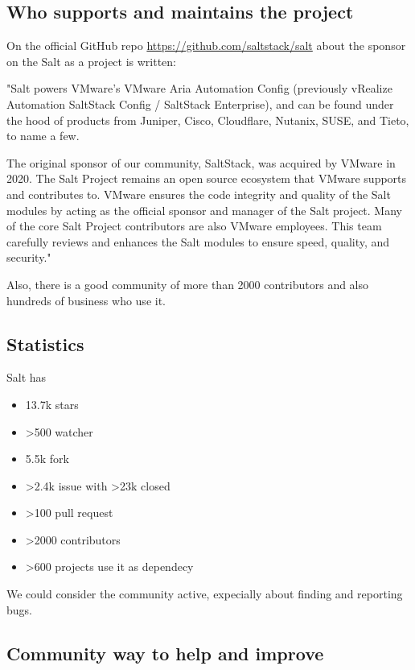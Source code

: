\documentclass[12pt,a4paper,openright,twoside]{book}
\begin{document}
\subsection{Who supports and maintains the project}
On the official GitHub repo \url{https://github.com/saltstack/salt} about the sponsor on the Salt as a project is written:


"Salt powers VMware's VMware Aria Automation Config (previously vRealize Automation SaltStack Config / SaltStack Enterprise), and can be found under the hood of products from Juniper, Cisco, Cloudflare, Nutanix, SUSE, and Tieto, to name a few.


The original sponsor of our community, SaltStack, was acquired by VMware in 2020. The Salt Project remains an open source ecosystem that VMware supports and contributes to. VMware ensures the code integrity and quality of the Salt modules by acting as the official sponsor and manager of the Salt project. Many of the core Salt Project contributors are also VMware employees. This team carefully reviews and enhances the Salt modules to ensure speed, quality, and security."\cite{saltGitHub}


Also, there is a good community of more than 2000 contributors and also hundreds of business who use it.

\subsection{Statistics}
Salt has 
\begin{itemize}
    \item 13.7k stars
    \item >500 watcher
    \item 5.5k fork
    \item >2.4k issue with >23k closed
    \item >100 pull request
    \item >2000 contributors
    \item >600 projects use it as dependecy
\end{itemize}

We could consider the community active, expecially about finding and reporting bugs.

\subsection{Community way to help and improve}
\end{document}
